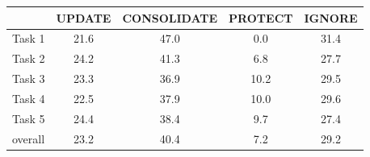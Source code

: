 \begin{tabular}{@{}lcccc@{}}
\toprule
& \textbf{UPDATE} & \textbf{CONSOLIDATE} & \textbf{PROTECT} & \textbf{IGNORE} \\
\midrule
Task 1 & 21.6 & 47.0 & 0.0 & 31.4 \\
Task 2 & 24.2 & 41.3 & 6.8 & 27.7 \\
Task 3 & 23.3 & 36.9 & 10.2 & 29.5 \\
Task 4 & 22.5 & 37.9 & 10.0 & 29.6 \\
Task 5 & 24.4 & 38.4 & 9.7 & 27.4 \\
\midrule
overall & 23.2 & 40.4 & 7.2 & 29.2 \\
\bottomrule
\end{tabular}
